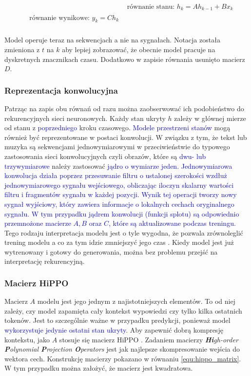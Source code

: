 \documentclass[data-science]{agh-wi} %
\begin{document}
\begin{align}
     & \text{równanie stanu: }h_k = Ah_{k-1} + Bx_k \label{equ:rownanie_stanu_seq} \\
    \begin{split}
        &\text{równanie wynikowe: }y_k = Ch_k \label{equ:rownanie_wynikowe_seq} \\
    \end{split}
\end{align}

Model operuje teraz na sekwencjach a nie na sygnałach. Notacja została zmieniona z $t$ na $k$ aby lepiej zobrazować, że obecnie model pracuje na dyskretnych znacznikach czasu. Dodatkowo w zapisie równania usunięto macierz $D$.

\subsubsection*{Reprezentacja konwolucyjna}
Patrząc na zapis obu równań od razu można zaobserwować ich podobieństwo do rekurencyjnych sieci neuronowych. Każdy stan ukryty $h$ zależy w głównej mierze od stanu z \textcolor{blue}{poprzedniego} kroku czasowego. \textcolor{blue}{Modele przestrzeni stanów} mogą również być reprezentowane w postaci konwolucji. W związku z tym, że tekst lub muzyka są sekwencjami jednowymiarowymi w przeciwieństwie do typowego zastosowania sieci konwolucyjnych czyli obrazów, które są \textcolor{blue}{dwu- lub trzywymiarowe} należy zastosować \textcolor{blue}{jądro o wymiarze jeden.  Jednowymiarowa konwolucja działa poprzez przesuwanie filtru o ustalonej szerokości wzdłuż jednowymiarowego sygnału wejściowego, obliczając iloczyn skalarny wartości filtru i fragmentów sygnału w każdej pozycji. Wynik tej operacji tworzy nowy sygnał wyjściowy, który zawiera informacje o lokalnych cechach oryginalnego sygnału. W tym przypadku jądrem konwolucji (funkcji splotu) są odpowiednio przemnożone macierze $A, B$ oraz $C$, które są aktualizowane podczas treningu.} Tego rodzaju interpretacja modelu jest o tyle wygodna, że pozwala zrównoleglić trening modelu a co za tym idzie zmniejszyć jego czas \cite{ssm_notacja}. Kiedy model jest już wytrenowany i gotowy do generowania, można bez problemu przejść na interpretację rekurencyjną.

\subsubsection*{Macierz HiPPO}
Macierz $A$ modelu jest jego jednym z najistotniejszych elementów. To od niej zależy, czy model zapamięta cały kontekst wypowiedzi czy tylko kilka ostatnich tokenów. Jest to szczególnie ważne w przypadku predykcji, ponieważ model \textcolor{blue}{wykorzystuje jedynie ostatni stan ukryty}. Aby zapewnić dobrą kompresję kontekstu, jako $A$ stosuje się macierz HiPPO \cite{hippo}. Zadaniem macierzy \textit{\textbf{Hi}gh-order \textbf{P}olynomial \textbf{P}rojection \textbf{O}perators} jest jak najlepsze skompresowanie wejścia do wektora cech. Konstrukcję macierzy pokazano w równaniu \ref*{equ:hippo_matrix}. W tym przypadku można założyć, że macierz jest kwadratowa.
\end{document}
